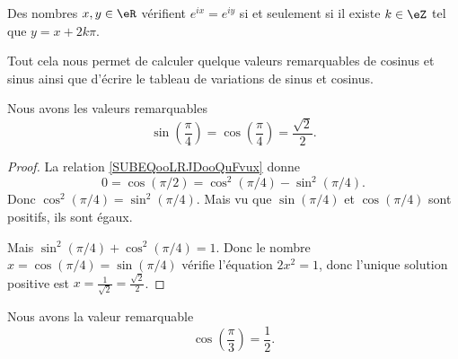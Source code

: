 \begin{corollary}   \label{CORooTFMAooHDRrqi}
    Des nombres \( x,y\in \eR\) vérifient \(  e^{ix}= e^{iy}\) si et seulement si il existe \( k\in\eZ\) tel que \( y=x+2k\pi\).
\end{corollary}

Tout cela nous permet de calculer quelque valeurs remarquables de cosinus et sinus ainsi que d'écrire le tableau de variations de sinus et cosinus.

\begin{lemma}       \label{LEMooIGNPooPEctJy}
    Nous avons les valeurs remarquables
    \begin{equation}
        \sin(\frac{ \pi }{ 4 })=\cos(\frac{ \pi }{ 4 })=\frac{ \sqrt{ 2 } }{2}.
    \end{equation}
\end{lemma}

\begin{proof}
    La relation \eqref{SUBEQooLRJDooQuFvux} donne
    \begin{equation}
        0=\cos(\pi/2)=\cos^2(\pi/4)-\sin^2(\pi/4).
    \end{equation}
    Donc \( \cos^2(\pi/4)=\sin^2(\pi/4)\). Mais vu que \( \sin(\pi/4)\) et \( \cos(\pi/4)\) sont positifs, ils sont égaux.

    Mais \( \sin^2(\pi/4)+\cos^2(\pi/4)=1\). Donc le nombre \( x=\cos(\pi/4)=\sin(\pi/4)\) vérifie l'équation \( 2x^2=1\), donc l'unique solution positive est \( x=\frac{1}{ \sqrt{ 2 } }=\frac{ \sqrt{ 2 } }{2}\).
\end{proof}

\begin{lemma}       \label{LEMooRMHAooDEAPMw}
    Nous avons la valeur remarquable
    \begin{equation}
        \cos(\frac{ \pi }{ 3 })=\frac{ 1 }{2}.
    \end{equation}
\end{lemma}

